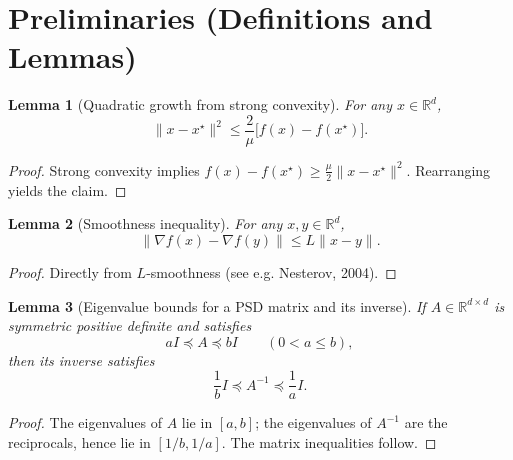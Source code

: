 \documentclass{article}
\newtheorem{lemma}{Lemma}
\newcommand{\R}{\mathbb{R}}
\begin{document}
\section*{Preliminaries (Definitions and Lemmas)}
\begin{lemma}[Quadratic growth from strong convexity]
\label{lem:strong-conv}
For any $x\in\R^{d}$,
\[
\|x-x^{\star}\|^{2}\le\frac{2}{\mu}\bigl[f(x)-f(x^{\star})\bigr].
\]
\end{lemma}
\begin{proof}
Strong convexity implies
$f(x)-f(x^{\star})\ge\frac{\mu}{2}\|x-x^{\star}\|^{2}$. Rearranging yields the claim. \qedhere
\end{proof}

\begin{lemma}[Smoothness inequality]
\label{lem:smooth}
For any $x,y\in\R^{d}$,
\[
\|\nabla f(x)-\nabla f(y)\|\le L\|x-y\|.
\]
\end{lemma}
\begin{proof}
Directly from $L$‑smoothness (see e.g. Nesterov, 2004). \qedhere
\end{proof}

\begin{lemma}[Eigenvalue bounds for a PSD matrix and its inverse]
\label{lem:eig-bound}
If $A\in\R^{d\times d}$ is symmetric positive definite and satisfies
\[
a I \preceq A \preceq b I\qquad (0<a\le b),
\]
then its inverse satisfies
\[
\frac{1}{b} I \preceq A^{-1} \preceq \frac{1}{a} I .
\]
\end{lemma}
\begin{proof}
The eigenvalues of $A$ lie in $[a,b]$; the eigenvalues of $A^{-1}$ are the reciprocals, hence lie in $[1/b,1/a]$. The matrix inequalities follow. \qedhere
\end{proof}
\end{document}
